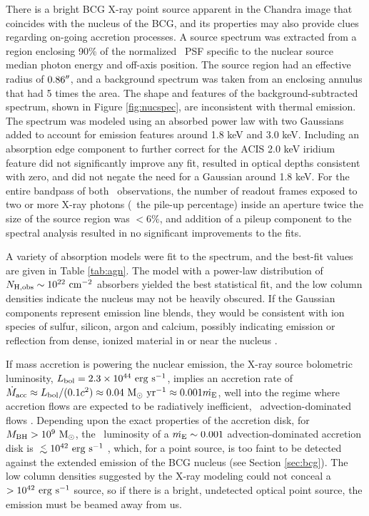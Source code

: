 \documentclass[iop]{emulateapj}
\begin{document}
There is a bright BCG X-ray point source apparent in the Chandra image
that coincides with the nucleus of the BCG, and its properties may
also provide clues regarding on-going accretion processes. A source
spectrum was extracted from a region enclosing 90\% of the normalized
\cxo\ PSF specific to the nuclear source median photon energy and
off-axis position. The source region had an effective radius of
$0.86\rm{^\prime}\hskip -0.1em\rm{^\prime}$, and a background spectrum was taken from an enclosing
annulus that had 5 times the area. The shape and features of the
background-subtracted spectrum, shown in Figure \ref{fig:nucspec}, are
inconsistent with thermal emission. The spectrum was modeled using an
absorbed power law with two Gaussians added to account for emission
features around 1.8 keV and 3.0 keV. Including an absorption edge
component to further correct for the ACIS 2.0 keV iridium feature did
not significantly improve any fit, resulted in optical depths
consistent with zero, and did not negate the need for a Gaussian
around 1.8 keV. For the entire bandpass of both \cxo\ observations,
the number of readout frames exposed to two or more X-ray photons
(\ie\ the pile-up percentage) inside an aperture twice the size of the
source region was $< 6\%$, and addition of a pileup component to the
spectral analysis resulted in no significant improvements to the fits.

A variety of absorption models were fit to the spectrum, and the
best-fit values are given in Table \ref{tab:agn}. The model with a
power-law distribution of $N_{\rm{H,obs}} \sim 10^{22} ~\mbox{\ensuremath{\rm{cm^{-2}}}}$ absorbers
yielded the best statistical fit, and the low column densities
indicate the nucleus may not be heavily obscured. If the Gaussian
components represent emission line blends, they would be consistent
with ion species of sulfur, silicon, argon and calcium, possibly
indicating emission or reflection from dense, ionized material in or
near the nucleus \citep[\eg][]{1990ApJ...362...90B,
  1998MNRAS.297.1219I}.

If mass accretion is powering the nuclear emission, the X-ray source
bolometric luminosity, $L_{\rm{bol}} = 2.3 \times 10^{44} ~\rm{\mbox{\ensuremath{\rm{erg}}}~\ensuremath{\rm{\mbox{\ensuremath{\rm{s}}}^{-1}}}}$, implies an
accretion rate of $\dot{M}_{\rm{acc}} \approx L_{\rm{bol}}/(0.1 c^2) \approx 0.04
~\mbox{\ensuremath{\rm{M_{\odot}}~\rm{\mbox{\ensuremath{\rm{yr}}}^{-1}}}} \approx 0.001 \dot{m_{\rm{E}}}$, well into the regime where accretion
flows are expected to be radiatively inefficient,
\eg\ advection-dominated flows \citep{adaf}. Depending upon the exact
properties of the accretion disk, for $M_{\rm{BH}} > 10^9 ~\rm{M_{\odot}}$, the
\hbeta\ luminosity of a $\dot{m_{\rm{E}}} \sim 0.001$ advection-dominated
accretion disk is $\la 10^{42} ~\lum$ \citep{2002ApJ...570L..13C},
which, for a point source, is too faint to be detected against the
extended emission of the BCG nucleus (see Section \ref{sec:bcg}). The
low column densities suggested by the X-ray modeling could not conceal
a $> 10^{42} ~\rm{\mbox{\ensuremath{\rm{erg}}}~\ensuremath{\rm{\mbox{\ensuremath{\rm{s}}}^{-1}}}}$ source, so if there is a bright, undetected
optical point source, the emission must be beamed away from us.
\end{document}
